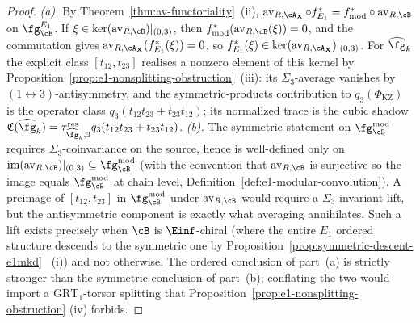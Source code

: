 \begin{proof}
\emph{(a).} By Theorem~\ref{thm:av-functoriality}~(ii),
$\operatorname{av}_{R,\cA_\mathbf{X}} \circ f^*_{E_1} =
f^*_{\mathrm{mod}} \circ \operatorname{av}_{R,\cB}$ on
$\fg^{E_1}_\cB$. If
$\xi \in \ker(\operatorname{av}_{R,\cB})|_{(0,3)}$, then
$f^*_{\mathrm{mod}}(\operatorname{av}_{R,\cB}(\xi)) = 0$, and the
commutation gives
$\operatorname{av}_{R,\cA_\mathbf{X}}(f^*_{E_1}(\xi)) = 0$, so
$f^*_{E_1}(\xi) \in
\ker(\operatorname{av}_{R,\cA_\mathbf{X}})|_{(0,3)}$.
For $\widehat{\fg}_k$ the explicit class $[t_{12},t_{23}]$
realises a nonzero element of this kernel by
Proposition~\ref{prop:e1-nonsplitting-obstruction}~(iii):
its $\Sigma_3$-average vanishes by
$(1\leftrightarrow 3)$-antisymmetry, and the
symmetric-products contribution to
$q_3(\Phi_{\mathrm{KZ}})$ is the operator class
$q_3(t_{12}t_{23}+t_{23}t_{12})$; its normalized trace is the cubic
shadow
$\mathfrak{C}(\widehat{\fg}_k)
=\tau_{\widehat{\fg}_k,3}^{\mathrm{res}}
q_3(t_{12}t_{23}+t_{23}t_{12})$.
\emph{(b).} The symmetric statement on
$\fg^{\mathrm{mod}}_\cB$ requires $\Sigma_3$-coinvariance on the
source, hence is well-defined only on
$\operatorname{im}(\operatorname{av}_{R,\cB})|_{(0,3)} \subseteq
\fg^{\mathrm{mod}}_\cB$ \textup{(}with the convention that
$\operatorname{av}_{R,\cB}$ is surjective so the
image equals $\fg^{\mathrm{mod}}_\cB$ at chain level,
Definition~\textup{\ref{def:e1-modular-convolution}}\textup{)}.
A preimage of $[t_{12},t_{23}]$ in $\fg^{\mathrm{mod}}_\cB$
under $\operatorname{av}_{R,\cB}$ would require a
$\Sigma_3$-invariant lift, but the antisymmetric
component is exactly what averaging annihilates. Such a
lift exists precisely when $\cB$ is $\Einf$-chiral
\textup{(}where the entire $E_1$ ordered structure descends to
the symmetric one by
Proposition~\textup{\ref{prop:symmetric-descent-e1mkd}}~%
\textup{(i)}\textup{)} and not otherwise. The ordered conclusion of
part~\textup{(a)} is strictly stronger than the symmetric conclusion
of part~\textup{(b)}; conflating the two would import a
$\mathrm{GRT}_1$-torsor splitting that
Proposition~\textup{\ref{prop:e1-nonsplitting-obstruction}}%
\textup{(iv)} forbids. \qedhere
\end{proof}

